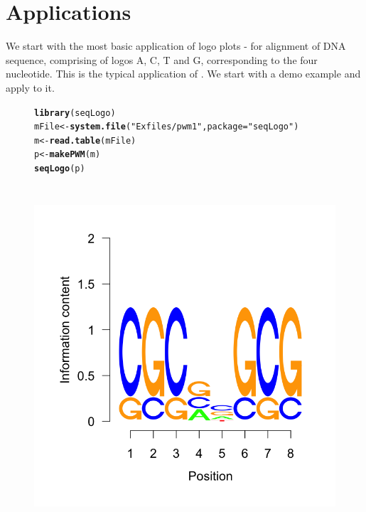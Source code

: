 \documentclass[12pt]{article}\usepackage[]{graphicx}\usepackage[usenames,dvipsnames]{color}
\makeatletter
\newcommand{\hlstr}[1]{\textcolor[rgb]{0.192,0.494,0.8}{#1}}%
\newcommand{\hlstd}[1]{\textcolor[rgb]{0.345,0.345,0.345}{#1}}%
\newcommand{\hlkwb}[1]{\textcolor[rgb]{0.69,0.353,0.396}{#1}}%
\newcommand{\hlkwc}[1]{\textcolor[rgb]{0.333,0.667,0.333}{#1}}%
\newcommand{\hlkwd}[1]{\textcolor[rgb]{0.737,0.353,0.396}{\textbf{#1}}}%
\newenvironment{kframe}{%
 \def\at@end@of@kframe{}%
 \ifinner\ifhmode%
  \def\at@end@of@kframe{\end{minipage}}%
  \begin{minipage}{\columnwidth}%
 \fi\fi%
 \def\FrameCommand##1{\hskip\@totalleftmargin \hskip-\fboxsep
 \colorbox{shadecolor}{##1}\hskip-\fboxsep
     \hskip-\linewidth \hskip-\@totalleftmargin \hskip\columnwidth}%
 \MakeFramed {\advance\hsize-\width
   \@totalleftmargin\z@ \linewidth\hsize
   \@setminipage}}%
 {\par\unskip\endMakeFramed%
 \at@end@of@kframe}
\newenvironment{knitrout}{}{} %
\makeatother
\begin{document}
\section{Applications}

We start with the most basic application of logo plots - for alignment of DNA sequence, comprising of logos A, C, T and G, corresponding to the four nucleotide. This is the typical application of . We start with a demo example and apply  to it.

\begin{figure}[h]
\begin{center}
\begin{knitrout}
\color{fgcolor}\begin{kframe}
\begin{alltt}
\hlkwd{library}\hlstd{(seqLogo)}
\hlstd{mFile} \hlkwb{<-} \hlkwd{system.file}\hlstd{(}\hlstr{"Exfiles/pwm1"}\hlstd{,} \hlkwc{package}\hlstd{=}\hlstr{"seqLogo"}\hlstd{)}
\hlstd{m} \hlkwb{<-} \hlkwd{read.table}\hlstd{(mFile)}
\hlstd{p} \hlkwb{<-} \hlkwd{makePWM}\hlstd{(m)}
\hlkwd{seqLogo}\hlstd{(p)}
\end{alltt}
\end{kframe}
\includegraphics[width=5in,height=5in]{figure/seqlogo_use-1} 

\end{knitrout}
\end{center}
\end{figure}
\end{document}
